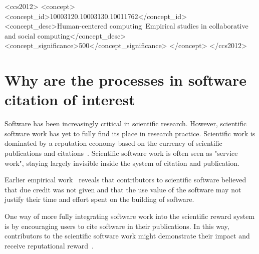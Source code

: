 \documentclass[sigchi-a,screen]{acmart}
\begin{document}
\begin{CCSXML}
<ccs2012>
<concept>
<concept_id>10003120.10003130.10011762</concept_id>
<concept_desc>Human-centered computing~Empirical studies in collaborative and social computing</concept_desc>
<concept_significance>500</concept_significance>
</concept>
</ccs2012>
\end{CCSXML}




\maketitle

\section{Why are the processes in software citation of interest}

Software has been increasingly critical in scientific research. However, scientific software work has yet to fully find its place in research practice. Scientific work is dominated by a reputation economy based on the currency of scientific publications and citations~\cite{howison2011scientific}. Scientific software work is often seen as "service work", staying largely invisible inside the system of citation and publication.

Earlier empirical work~\cite{howison2013incentives,howison2011scientific} reveals that contributors to scientific software believed that due credit was not given and that the use value of the software may not justify their time and effort spent on the building of software. 

One way of more fully integrating software work into the scientific reward system is by encouraging users to cite software in their publications. In this way, contributors to the scientific software work might demonstrate their impact and receive reputational reward~\cite{howison2015understanding}.
\end{document}
